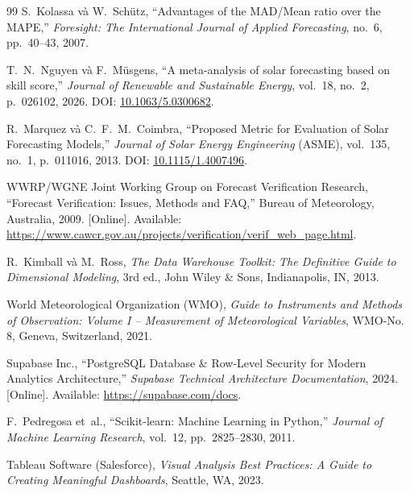 \documentclass[12pt, a4paper]{report}
\begin{document}
\begin{thebibliography}{99}
S.~Kolassa và W.~Schütz,
\newblock ``Advantages of the MAD/Mean ratio over the MAPE,''
\newblock \textit{Foresight: The International Journal of Applied Forecasting}, no.~6, pp.~40--43, 2007.

T.~N.~Nguyen và F.~Müsgens,
\newblock ``A meta-analysis of solar forecasting based on skill score,''
\newblock \textit{Journal of Renewable and Sustainable Energy}, vol.~18, no.~2, p.~026102, 2026.
\newblock DOI: \href{https://doi.org/10.1063/5.0300682}{10.1063/5.0300682}.

R.~Marquez và C.~F.~M.~Coimbra,
\newblock ``Proposed Metric for Evaluation of Solar Forecasting Models,''
\newblock \textit{Journal of Solar Energy Engineering} (ASME), vol.~135, no.~1, p.~011016, 2013.
\newblock DOI: \href{https://doi.org/10.1115/1.4007496}{10.1115/1.4007496}.

WWRP/WGNE Joint Working Group on Forecast Verification Research,
\newblock ``Forecast Verification: Issues, Methods and FAQ,''
\newblock Bureau of Meteorology, Australia, 2009. [Online]. Available: \url{https://www.cawcr.gov.au/projects/verification/verif_web_page.html}.

R.~Kimball và M.~Ross,
\newblock \textit{The Data Warehouse Toolkit: The Definitive Guide to Dimensional Modeling}, 3rd ed.,
\newblock John Wiley \& Sons, Indianapolis, IN, 2013.

World Meteorological Organization (WMO),
\newblock \textit{Guide to Instruments and Methods of Observation: Volume I -- Measurement of Meteorological Variables},
\newblock WMO-No. 8, Geneva, Switzerland, 2021.

Supabase Inc.,
\newblock ``PostgreSQL Database \& Row-Level Security for Modern Analytics Architecture,''
\newblock \textit{Supabase Technical Architecture Documentation}, 2024. [Online]. Available: \url{https://supabase.com/docs}.

F.~Pedregosa et~al.,
\newblock ``Scikit-learn: Machine Learning in Python,''
\newblock \textit{Journal of Machine Learning Research}, vol.~12, pp.~2825--2830, 2011.

Tableau Software (Salesforce),
\newblock \textit{Visual Analysis Best Practices: A Guide to Creating Meaningful Dashboards},
\newblock Seattle, WA, 2023.


\end{thebibliography}
\end{document}
